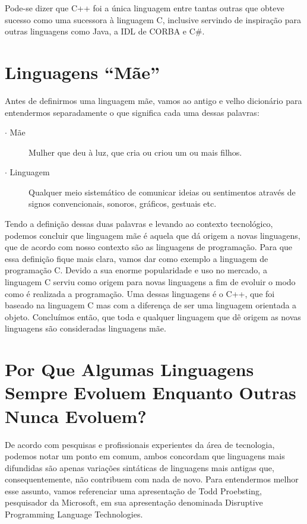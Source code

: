 \documentclass[
    12pt,               %
    openright,          %
    twoside,            %
    a4paper,            %
    brazil              %
    ]{abntex2}
\begin{document}
Pode-se dizer que C++ foi a única linguagem entre tantas outras que obteve
sucesso como uma sucessora à linguagem C, inclusive servindo de inspiração para
outras linguagens como Java, a IDL de CORBA e C\#.\cite{CPP}

\chapter{Linguagens “Mãe”}

Antes de definirmos uma linguagem mãe, vamos ao antigo e velho dicionário para
entendermos separadamente o que significa cada uma dessas palavras: 

\begin{description} \item[$\cdot$ Mãe] Mulher que deu à luz, que cria ou criou
um ou mais filhos.  \item[$\cdot$ Linguagem] Qualquer meio sistemático de
comunicar ideias ou sentimentos através de signos convencionais, sonoros,
gráficos, gestuais etc.
\end{description}

Tendo a definição dessas duas palavras e levando ao contexto tecnológico,
podemos concluir que linguagem mãe é aquela que dá origem a novas linguagens,
que de acordo com nosso contexto são as linguagens de programação.  Para que
essa definição fique mais clara, vamos dar como exemplo a linguagem de
programação C. Devido a sua enorme popularidade e uso no mercado, a linguagem C
serviu como origem para novas linguagens a fim de evoluir o modo como é
realizada a programação. Uma dessas linguagens é o C++, que foi baseado na
linguagem C mas com a diferença de ser uma linguagem orientada a objeto.
Concluímos então, que toda e qualquer linguagem que dê origem as novas
linguagens são consideradas linguagens mãe.

\chapter{Por Que Algumas Linguagens Sempre Evoluem Enquanto Outras Nunca Evoluem?}

De acordo com pesquisas e profissionais experientes da área de tecnologia,
podemos notar um ponto em comum, ambos concordam que linguagens mais difundidas
são apenas variações sintáticas de linguagens mais antigas que,
consequentemente, não contribuem com nada de novo.  Para entendermos melhor esse
assunto, vamos referenciar uma apresentação de Todd Proebsting, pesquisador da
Microsoft, em sua apresentação denominada Disruptive Programming Language
Technologies.\cite{proebsting2002disruptive}
\end{document}
